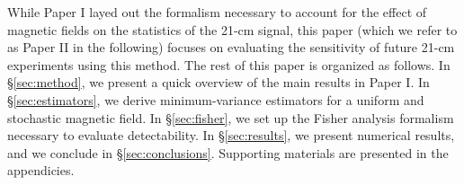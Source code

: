 While Paper I layed out the formalism necessary to account for the effect of  magnetic fields on the statistics of the 21-cm signal, this paper (which we refer to as Paper II in the following) focuses on evaluating the sensitivity of future 21-cm experiments using this method. The rest of this paper is organized as follows. In \S\ref{sec:method}, we present a quick overview of the main results in Paper I. In \S\ref{sec:estimators}, we derive minimum-variance estimators for a uniform and stochastic magnetic field. In \S\ref{sec:fisher}, we set up the Fisher analysis formalism necessary to evaluate detectability. In \S\ref{sec:results}, we present numerical results, and we conclude in \S\ref{sec:conclusions}. Supporting materials are presented in the appendicies.
